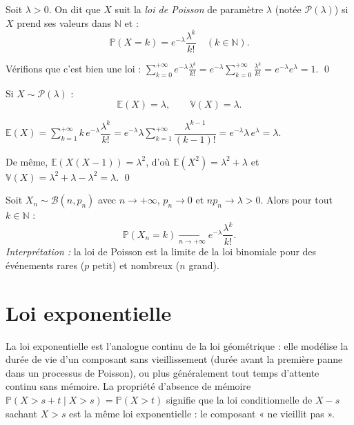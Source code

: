 \documentclass[11pt,a4paper,twoside]{book}
\newcommand{\N}{\mathbb{N}}
\begin{document}
\begin{definitionbox}
Soit $\lambda > 0$. On dit que $X$ suit la \emph{loi de Poisson} de paramètre $\lambda$
(notée $\mathcal{P}(\lambda)$) si $X$ prend ses valeurs dans $\N$ et :
\[
  \mathbb{P}(X = k) = e^{-\lambda} \frac{\lambda^k}{k!} \quad (k \in \N).
\]
\end{definitionbox}

\begin{preuvebox}
Vérifions que c'est bien une loi : $\displaystyle\sum_{k=0}^{+\infty} e^{-\lambda}\frac{\lambda^k}{k!}
= e^{-\lambda} \sum_{k=0}^{+\infty} \frac{\lambda^k}{k!} = e^{-\lambda} e^{\lambda} = 1$. \qed
\end{preuvebox}

\begin{theoremebox}
Si $X \sim \mathcal{P}(\lambda)$ :
\[
  \mathbb{E}(X) = \lambda, \qquad \mathbb{V}(X) = \lambda.
\]
\end{theoremebox}

\begin{preuvebox}
$\mathbb{E}(X) = \sum_{k=1}^{+\infty} k \, e^{-\lambda}\dfrac{\lambda^k}{k!}
= e^{-\lambda}\lambda \sum_{k=1}^{+\infty} \dfrac{\lambda^{k-1}}{(k-1)!}
= e^{-\lambda}\lambda \, e^{\lambda} = \lambda$.

De même, $\mathbb{E}(X(X-1)) = \lambda^2$, d'où $\mathbb{E}(X^2) = \lambda^2 + \lambda$
et $\mathbb{V}(X) = \lambda^2 + \lambda - \lambda^2 = \lambda$. \qed
\end{preuvebox}

\begin{theoremebox}
Soit $X_n \sim \mathcal{B}(n,p_n)$ avec $n \to +\infty$, $p_n \to 0$ et $np_n \to \lambda > 0$.
Alors pour tout $k \in \N$ :
\[
  \mathbb{P}(X_n = k) \underset{n \to +\infty}{\longrightarrow} e^{-\lambda}\frac{\lambda^k}{k!}.
\]
\emph{Interprétation :} la loi de Poisson est la limite de la loi binomiale pour des événements
rares ($p$ petit) et nombreux ($n$ grand).
\end{theoremebox}

\section{Loi exponentielle}

La loi exponentielle est l'analogue continu de la loi géométrique : elle modélise la durée de vie d'un composant sans vieillissement (durée avant la première panne dans un processus de Poisson), ou plus généralement tout temps d'attente continu sans mémoire. La propriété d'absence de mémoire $\mathbb{P}(X > s+t \mid X > s) = \mathbb{P}(X > t)$ signifie que la loi conditionnelle de $X - s$ sachant $X > s$ est la même loi exponentielle : le composant « ne vieillit pas ».
\end{document}
